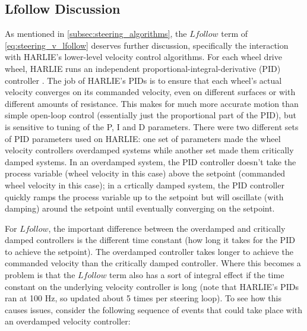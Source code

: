 \subsection{Lfollow Discussion}\label{subsec:lfollow_discussion_steering}

As mentioned in \autoref{subsec:steering_algorithms}, the $Lfollow$ term of \eqref{eq:steering_v_lfollow} deserves further discussion, specifically the interaction with HARLIE's lower-level velocity control algorithms. For each wheel drive wheel, HARLIE runs an independent proportional-integral-derivative (PID) controller \autocite{PIDControllerWiki}. The job of HARLIE's PIDs is to ensure that each wheel's actual velocity converges on its commanded velocity, even on different surfaces or with different amounts of resistance. This makes for much more accurate motion than simple open-loop control (essentially just the proportional part of the PID), but is sensitive to tuning of the P, I and D parameters. There were two different sets of PID parameters used on HARLIE: one set of parameters made the wheel velocity controllers overdamped systems while another set made them critically damped systems. In an overdamped system, the PID controller doesn't take the process variable (wheel velocity in this case) above the setpoint (commanded wheel velocity in this case); in a crtically damped system, the PID controller quickly ramps the process variable up to the setpoint but will oscillate (with damping) around the setpoint until eventually converging on the setpoint.

For $Lfollow$, the important difference between the overdamped and critically damped controllers is the different time constant (how long it takes for the PID to achieve the setpoint). The overdamped controller takes longer to achieve the commanded velocity than the critically damped controller. Where this becomes a problem is that the $Lfollow$ term also has a sort of integral effect if the time constant on the underlying velocity controller is long (note that HARLIE's PIDs ran at 100 Hz, so updated about 5 times per steering loop). To see how this causes issues, consider the following sequence of events that could take place with an overdamped velocity controller:

